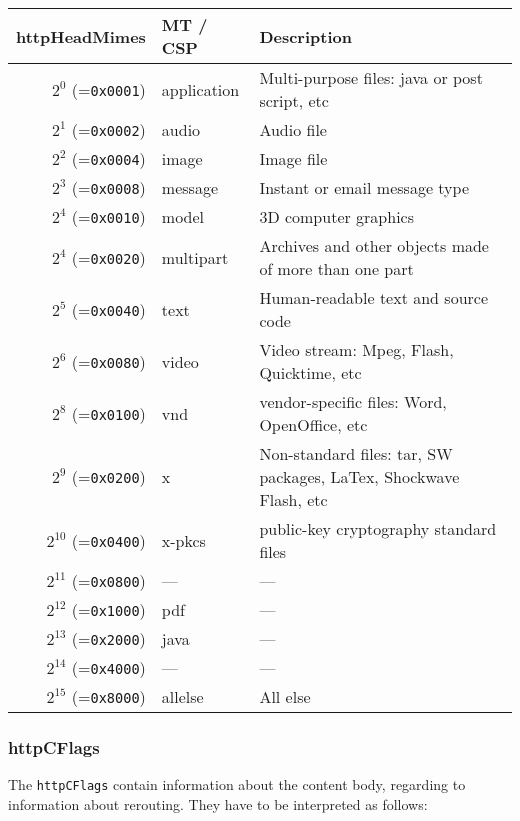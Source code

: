 \documentclass[documentation]{subfiles}
\begin{document}
\begin{longtable}{rll}
    \toprule
    {\bf httpHeadMimes} & {\bf MT / CSP} & {\bf Description} \\
    \midrule\endhead%
    $2^{0}$  (={\tt 0x0001}) & application & Multi-purpose files: java or post script, etc \\
    $2^{1}$  (={\tt 0x0002}) & audio & Audio file \\
    $2^{2}$  (={\tt 0x0004}) & image & Image file \\
    $2^{3}$  (={\tt 0x0008}) & message & Instant or email message type \\
    $2^{4}$  (={\tt 0x0010}) & model &  3D computer graphics \\
    $2^{4}$  (={\tt 0x0020}) & multipart & Archives and other objects made of more than one part \\
    $2^{5}$  (={\tt 0x0040}) & text & Human-readable text and source code\\
    $2^{6}$  (={\tt 0x0080}) & video & Video stream: Mpeg, Flash, Quicktime, etc \\
    $2^{8}$  (={\tt 0x0100}) & vnd &  vendor-specific files: Word, OpenOffice, etc \\
    $2^{9}$  (={\tt 0x0200}) & x & Non-standard files: tar, SW packages, LaTex, Shockwave Flash, etc \\
    $2^{10}$ (={\tt 0x0400}) & x-pkcs & public-key cryptography standard files\\
    $2^{11}$ (={\tt 0x0800}) & --- & ---\\
    $2^{12}$ (={\tt 0x1000}) & pdf & ---\\
    $2^{13}$ (={\tt 0x2000}) & java & ---\\
    $2^{14}$ (={\tt 0x4000}) & --- & ---\\
    $2^{15}$ (={\tt 0x8000}) & allelse & All else\\
    \bottomrule
\end{longtable}

\subsubsection{httpCFlags}\label{httpCFlags}
The {\tt httpCFlags} contain information about the content body, regarding to
information about rerouting. They have to be interpreted as follows:
\end{document}
